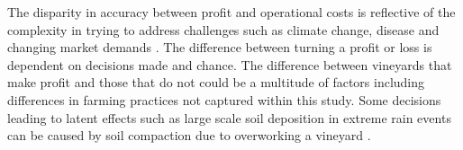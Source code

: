 \documentclass[review,12pt,authoryear]{elsarticle}
\begin{document}
\begin{linenumbers}









The disparity in accuracy between profit and operational costs is reflective of the complexity in trying to address challenges such as climate change, disease and changing market demands \citep{wineaustraliaNationalVintageReport2020,wineaustraliaNationalVintageReport2021,wineaustraliaNationalVintageReport2022}. The difference between turning a profit or loss is dependent on decisions made and chance. The difference between vineyards that make profit and those that do not could be a multitude of factors including differences in farming practices not captured within this study. Some decisions leading to latent effects such as large scale soil deposition in extreme rain events can be caused by soil compaction due to overworking a vineyard \citep{capelloPermanentCoverSoil2020}. 

\iffalse



\end{linenumbers}
\end{document}
